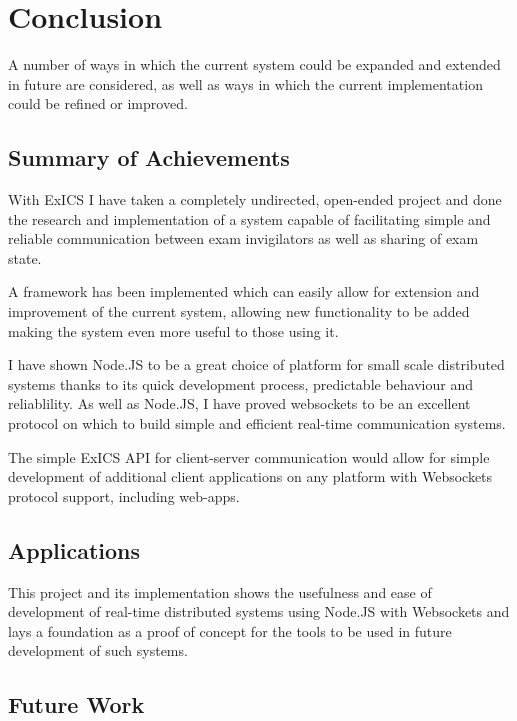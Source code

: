 
\chapter{Conclusion}

\label{ch:conclusions}

A number of ways in which the current system could be expanded and extended in future are considered, as well as ways in which the current implementation could be refined or improved.

\section{Summary of Achievements}

With ExICS I have taken a completely undirected, open-ended project and done the research and implementation of a system capable of facilitating simple and reliable communication between exam invigilators as well as sharing of exam state.

A framework has been implemented which can easily allow for extension and improvement of the current system, allowing new functionality to be added making the system even more useful to those using it.

I have shown Node.JS to be a great choice of platform for small scale distributed systems thanks to its quick development process, predictable behaviour and reliablility.  As well as Node.JS, I have proved websockets to be an excellent protocol on which to build simple and efficient real-time communication systems.

The simple ExICS API for client-server communication would allow for simple development of additional client applications on any platform with Websockets protocol support, including web-apps.

\section{Applications}

This project and its implementation shows the usefulness and ease of development of real-time distributed systems using Node.JS with Websockets and lays a foundation as a proof of concept for the tools to be used in future development of such systems.

\section{Future Work}
\label{sec:future_work}

